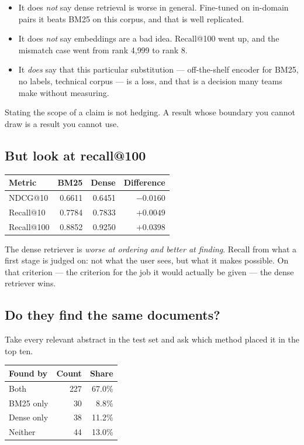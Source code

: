 \documentclass[11pt,a4paper]{article}
\begin{document}
\begin{itemize}[leftmargin=*,nosep]
  \item It does \emph{not} say dense retrieval is worse in general. Fine-tuned
        on in-domain pairs it beats BM25 on this corpus, and that is
        well replicated.
  \item It does \emph{not} say embeddings are a bad idea. Recall@100 went up,
        and the mismatch case went from rank 4{,}999 to rank 8.
  \item It \emph{does} say that this particular substitution --- off-the-shelf
        encoder for BM25, no labels, technical corpus --- is a loss, and that
        is a decision many teams make without measuring.
\end{itemize}

Stating the scope of a claim is not hedging. A result whose boundary you cannot
draw is a result you cannot use.

\subsection{But look at recall@100}

\begin{center}
\small
\begin{tabular}{lrrr}
\toprule
\textbf{Metric} & \textbf{BM25} & \textbf{Dense} & \textbf{Difference} \\
\midrule
NDCG@10    & 0.6611 & 0.6451 & $-0.0160$ \\
Recall@10  & 0.7784 & 0.7833 & $+0.0049$ \\
Recall@100 & 0.8852 & 0.9250 & $+0.0398$ \\
\bottomrule
\end{tabular}
\end{center}

The dense retriever is \emph{worse at ordering and better at finding}. Recall
from  what a first stage is judged on: not what the user sees, but
what it makes possible. On that criterion --- the criterion for the job it
would actually be given --- the dense retriever wins.

\subsection{Do they find the same documents?}

Take every relevant abstract in the test set and ask which method placed it in
the top ten.

\begin{center}
\small
\begin{tabular}{lrr}
\toprule
\textbf{Found by} & \textbf{Count} & \textbf{Share} \\
\midrule
Both        & 227 & 67.0\% \\
BM25 only   & 30  & 8.8\% \\
Dense only  & 38  & 11.2\% \\
Neither     & 44  & 13.0\% \\
\bottomrule
\end{tabular}
\end{center}
\end{document}
